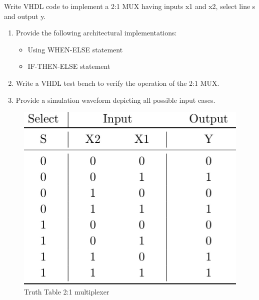 \documentclass{article}
\begin{document}
\begin{Q}
    {
        Write VHDL code to implement a 2:1 MUX having inputs x1 and x2, select line s and output
        y.
        \begin{enumerate}
            \item   Provide the following architectural implementations:
                  \begin{itemize}
                      \item Using WHEN-ELSE statement
                      \item IF-THEN-ELSE statement
                  \end{itemize}
            \item  Write a VHDL test bench to verify the operation of the  2:1 MUX.
            \item Provide a simulation waveform depicting all possible input cases.
        \end{enumerate}
    }
\end{Q}


\begin{figure}[H]
    \centering
    \includegraphics[scale=0.5,cframe=blue 0.5pt 3pt]{5tt.jpg}
    \caption{Truth Table 2:1 multiplexer}
\end{figure}
\end{document}
